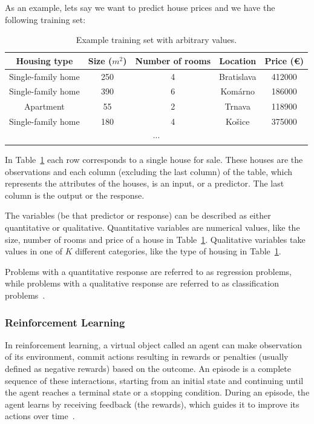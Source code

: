 \documentclass[a4paper,oneside,onecolumn,12pt]{book}
\begin{document}
		As an example, lets say we want to predict house prices and we have the following training set:
		\begin{table}[H]
		\begin{center}
		\begin{tabular}{|c|c|c|c||c|}
			\hline
			\textbf{Housing type} & \textbf{Size ($m^2$)} & \textbf{Number of rooms} & \textbf{Location} & \textbf{Price (€)}\\
			\hline
			Single-family home & 250 & 4 & Bratislava & 412000\\
			\hline
			Single-family home & 390 & 6 & Komárno & 186000\\ 
			\hline
			Apartment & 55 & 2 & Trnava & 118900\\
			\hline
			Single-family home & 180 & 4 & Košice & 375000\\
			\hline
			\multicolumn{5}{|c|}{$\cdots$} \\
			\hline
		\end{tabular}
		\end{center}
		\caption{Example training set with arbitrary values.}
		\label{table:example_train_set}
		\end{table}
		In Table~\ref{table:example_train_set} each row corresponds to a single house for sale. These houses are the observations and each column (excluding the last column) of the table, which represents the attributes of the houses, is an input, or a predictor. The last column is the output or the response.

		The variables (be that predictor or response) can be described as either quantitative or qualitative. Quantitative variables are numerical values, like the size, number of rooms and price of a house in Table~\ref{table:example_train_set}. Qualitative variables take values in one of $K$ different categories, like the type of housing in Table~\ref{table:example_train_set}. 
		
		Problems with a quantitative response are referred to as regression problems, while problems with a qualitative response are referred to as classification problems~\cite{AISL}.

		\subsubsection{Reinforcement Learning}
		In reinforcement learning, a virtual object called an agent can make observation of its environment, commit actions resulting in rewards or penalties (usually defined as negative rewards) based on the outcome. An episode is a complete sequence of these interactions, starting from an initial state and continuing until the agent reaches a terminal state or a stopping condition. During an episode, the agent learns by receiving feedback (the rewards), which guides it to improve its actions over time~\cite{HMLSKT}.
\end{document}
